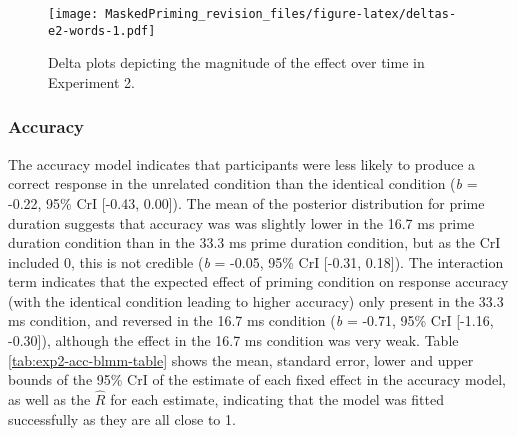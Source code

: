 \documentclass[
  english,
  man,floatsintext]{apa6}
\begin{document}
\begin{figure}
\centering
\texttt{[image: MaskedPriming\_revision\_files/figure-latex/deltas-e2-words-1.pdf]}
\caption{\label{fig:deltas-e2-words}Delta plots depicting the magnitude of the effect over time in Experiment 2.}
\end{figure}

\hypertarget{accuracy-1}{%
\subsubsection{Accuracy}\label{accuracy-1}}

The accuracy model indicates that participants were less likely to produce a correct response in the unrelated condition than the identical condition (\emph{b} = -0.22, 95\% CrI {[}-0.43, 0.00{]}). The mean of the posterior distribution for prime duration suggests that accuracy was was slightly lower in the 16.7 ms prime duration condition than in the 33.3 ms prime duration condition, but as the CrI included 0, this is not credible (\emph{b} = -0.05, 95\% CrI {[}-0.31, 0.18{]}). The interaction term indicates that the expected effect of priming condition on response accuracy (with the identical condition leading to higher accuracy) only present in the 33.3 ms condition, and reversed in the 16.7 ms condition (\emph{b} = -0.71, 95\% CrI {[}-1.16, -0.30{]}), although the effect in the 16.7 ms condition was very weak. Table \ref{tab:exp2-acc-blmm-table} shows the mean, standard error, lower and upper bounds of the 95\% CrI of the estimate of each fixed effect in the accuracy model, as well as the \(\hat{R}\) for each estimate, indicating that the model was fitted successfully as they are all close to 1.
\end{document}
